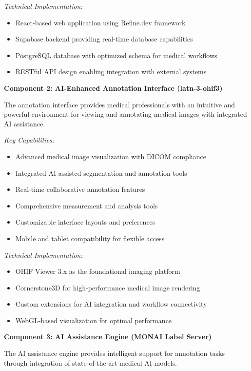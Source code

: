 \textit{Technical Implementation:}
\begin{itemize}
    \item React-based web application using Refine.dev framework
    \item Supabase backend providing real-time database capabilities
    \item PostgreSQL database with optimized schema for medical workflows
    \item RESTful API design enabling integration with external systems
\end{itemize}

\textbf{Component 2: AI-Enhanced Annotation Interface (latn-3-ohif3)}

The annotation interface provides medical professionals with an intuitive and powerful environment for viewing and annotating medical images with integrated AI assistance.

\textit{Key Capabilities:}
\begin{itemize}
    \item Advanced medical image visualization with DICOM compliance
    \item Integrated AI-assisted segmentation and annotation tools
    \item Real-time collaborative annotation features
    \item Comprehensive measurement and analysis tools
    \item Customizable interface layouts and preferences
    \item Mobile and tablet compatibility for flexible access
\end{itemize}

\textit{Technical Implementation:}
\begin{itemize}
    \item OHIF Viewer 3.x as the foundational imaging platform
    \item Cornerstone3D for high-performance medical image rendering
    \item Custom extensions for AI integration and workflow connectivity
    \item WebGL-based visualization for optimal performance
\end{itemize}

\textbf{Component 3: AI Assistance Engine (MONAI Label Server)}

The AI assistance engine provides intelligent support for annotation tasks through integration of state-of-the-art medical AI models.

